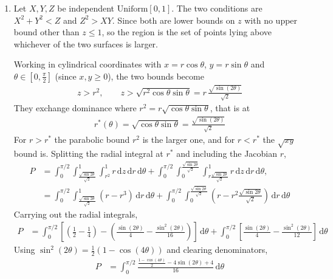 \documentclass[11pt]{article}
\newcommand{\dd}{\,\mathrm{d}}
\begin{document}
\begin{enumerate}[label=(\alph*)]
  \item
  Let $X, Y, Z$ be independent $\text{Uniform}[0,1]$. The two conditions are $X^2 + Y^2 < Z$ and
  $Z^2 > XY$. Since both are lower bounds
  on $z$ with no upper bound other than $z \le 1$, so the region is the set of points lying above
  whichever of the two surfaces is larger.

  Working in cylindrical coordinates with $x = r\cos\theta$, $y = r\sin\theta$ and
  $\theta \in [0, \tfrac{\pi}{2}]$ (since $x, y \ge 0$), the two bounds become
  \begin{align}
    z > r^2, \qquad z > \sqrt{r^2\cos\theta\sin\theta} = r\,\frac{\sqrt{\sin(2\theta)}}{\sqrt{2}}
  \end{align}
  They exchange dominance where $r^2 = r\sqrt{\cos\theta\sin\theta}$, that is at
  \begin{align}
    r^*(\theta) = \sqrt{\cos\theta\sin\theta} = \frac{\sqrt{\sin(2\theta)}}{\sqrt{2}}
  \end{align}
  For $r > r^*$ the parabolic bound $r^2$ is the larger one, and for $r < r^*$ the $\sqrt{xy}$ bound
  is. Splitting the radial integral at $r^*$ and including the Jacobian $r$,
  \begin{align}
    P &= \int_0^{\pi/2}\!\!\int_{\frac{\sqrt{\sin 2\theta}}{\sqrt{2}}}^{1}\!\!\int_{r^2}^{1} r \dd z \dd r \dd\theta
      + \int_0^{\pi/2}\!\!\int_{0}^{\frac{\sqrt{\sin 2\theta}}{\sqrt{2}}}\!\!
        \int_{r\frac{\sqrt{\sin 2\theta}}{\sqrt{2}}}^{1} r \dd z \dd r \dd\theta, \\
    &= \int_0^{\pi/2}\!\!\int_{\frac{\sqrt{\sin 2\theta}}{\sqrt{2}}}^{1} \left(r - r^3\right) \dd r \dd\theta
      + \int_0^{\pi/2}\!\!\int_{0}^{\frac{\sqrt{\sin 2\theta}}{\sqrt{2}}}
        \left(r - r^2\frac{\sqrt{\sin 2\theta}}{\sqrt{2}}\right) \dd r \dd\theta
  \end{align}
  Carrying out the radial integrals,
  \begin{align}
    P &= \int_0^{\pi/2}\left[\left(\frac{1}{2}-\frac{1}{4}\right)
      - \left(\frac{\sin(2\theta)}{4} - \frac{\sin^2(2\theta)}{16}\right)\right]\dd\theta
      + \int_0^{\pi/2}\left[\frac{\sin(2\theta)}{4} - \frac{\sin^2(2\theta)}{12}\right]\dd\theta
  \end{align}
  Using $\sin^2(2\theta) = \tfrac{1}{2}\left(1-\cos(4\theta)\right)$ and clearing denominators,
  \begin{align}
    P &= \int_0^{\pi/2}\frac{\frac{1-\cos(4\theta)}{2} - 4\sin(2\theta) + 4}{16}\dd\theta

\end{align}
\end{enumerate}
\end{document}
